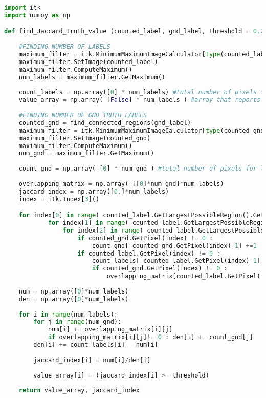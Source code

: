 \documentclass{standalone}
\begin{document}
\lstset{style=python}
	\begin{lstlisting}[language = python, caption = Modified Jaccard Index, label =modified_jaccard]
import itk
import numoy as np

def find_Jaccard_truth_value (counted_label, gnd_label, threshold = 0.25):
    
    #FINDING NUMBER OF LABELS
    maximum_filter = itk.MinimumMaximumImageCalculator[type(counted_label)].New()
    maximum_filter.SetImage(counted_label)
    maximum_filter.ComputeMaximum()
    num_labels = maximum_filter.GetMaximum()
    
    count_labels = np.array([0] * num_labels) #total number of pixels for lesion
    value_array = np.array( [False] * num_labels ) #array that reports what label is true
    
    #FINDING NUMBER OF GND TRUTH LABELS    
    counted_gnd = find_connected_regions(gnd_label)
    maximum_filter = itk.MinimumMaximumImageCalculator[type(counted_gnd)].New()
    maximum_filter.SetImage(counted_gnd)
    maximum_filter.ComputeMaximum()
    num_gnd = maximum_filter.GetMaximum()
    
    count_gnd = np.array( [0] * num_gnd ) #total number of pixels for lesion
    
    overlapping_matrix = np.array( [[0]*num_gnd]*num_labels)
    jaccard_index = np.array([0.]*num_labels)
    index = itk.Index[3]()

    for index[0] in range( counted_label.GetLargestPossibleRegion().GetSize()[0] ):
            for index[1] in range( counted_label.GetLargestPossibleRegion().GetSize()[1] ):
                for index[2] in range( counted_label.GetLargestPossibleRegion().GetSize()[2] ):
                    if counted_gnd.GetPixel(index) != 0 :
                        count_gnd[ counted_gnd.GetPixel(index)-1] +=1
                    if counted_label.GetPixel(index) != 0 :
                        count_labels[ counted_label.GetPixel(index)-1] +=1
                        if counted_gnd.GetPixel(index) != 0 :
                            overlapping_matrix[counted_label.GetPixel(index) - 1][counted_gnd.GetPixel(index)-1] += 1
                            
    num = np.array([0]*num_labels)
    den = np.array([0]*num_labels)
    
    for i in range(num_labels):
        for j in range(num_gnd):
            num[i] += overlapping_matrix[i][j]
            if overlapping_matrix[i][j]!= 0 : den[i] += count_gnd[j]
        den[i] += count_labels[i] - num[i]
        
        jaccard_index[i] = num[i]/den[i]
        
        value_array[i] = (jaccard_index[i] >= threshold)
        
    return value_array, jaccard_index


\end{lstlisting}
\end{document}
